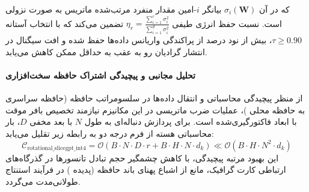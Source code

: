 که در آن $\sigma_i(\mathbf{W})$ بیانگر $i$-امین مقدار منفرد مرتب‌شده ماتریس به صورت نزولی است. نسبت حفظ انرژی طیفی $\eta_r = \frac{\sum_{i=1}^r \sigma_i^2}{\sum_{i=1}^{d} \sigma_i^2}$ تضمین می‌کند که با انتخاب آستانه $\tau \ge 0.90$، بیش از نود درصد از پراکندگی واریانس داده‌ها حفظ شده و افت سیگنال در انتشار گرادیان رو به عقب به حداقل ممکن کاهش می‌یابد.

\paragraph{تحلیل مجانبی و پیچیدگی اشتراک حافظه سخت‌افزاری}
از منظر پیچیدگی محاسباتی و انتقال داده‌ها در سلسومراتب حافظه (حافظه سراسری  به حافظه محلی )، عملیات ضرب ماتریسی در این مکانیزم نیازمند تخصیص بافر موقت با ابعاد فاکتورگیری‌شده است. برای پردازش دنباله‌ای به طول $N$ با بعد مخفی $D$، بار محاسباتی هسته از فرم درجه دو به رابطه زیر تقلیل می‌یابد:
\begin{equation}
\label{eq:complexity_rotational_slicegpt_int4}
\mathcal{C}_{\text{rotational\_slicegpt\_int4}} = \mathcal{O}\left( B \cdot N \cdot D \cdot r + B \cdot H \cdot N \cdot d_k \right) \ll \mathcal{O}\left( B \cdot H \cdot N^2 \cdot d_k \right)
\end{equation}
این بهبود مرتبه پیچیدگی، با کاهش چشمگیر حجم تبادل تانسورها در گذرگاه‌های ارتباطی کارت گرافیک، مانع از اشباع پهنای باند حافظه (پدیده ) در فرآیند استنتاج طولانی‌مدت می‌گردد.
